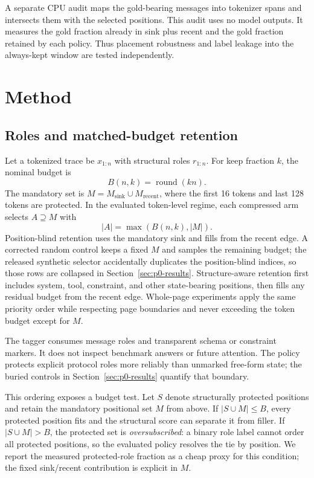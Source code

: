 A separate CPU audit maps the gold-bearing messages into tokenizer spans and
intersects them with the selected positions.  This audit uses no model outputs.
It measures the gold fraction already in sink plus recent and the gold fraction
retained by each policy.  Thus placement robustness and label leakage into the
always-kept window are tested independently.

\section{Method}
\label{sec:method}

\subsection{Roles and matched-budget retention}
\label{sec:retention-method}

Let a tokenized trace be $x_{1:n}$ with structural roles $r_{1:n}$.  For keep
fraction $k$, the nominal budget is
\begin{equation}
  B(n,k)=\operatorname{round}(kn).
  \label{eq:budget}
\end{equation}
The mandatory set is $M=M_{\mathrm{sink}}\cup M_{\mathrm{recent}}$, where the
first 16 tokens and last 128 tokens are protected.  In the evaluated token-level
regime, each compressed arm selects $A\supseteq M$ with
\begin{equation}
  |A|=\max(B(n,k),|M|).
  \label{eq:matched}
\end{equation}
Position-blind retention uses the mandatory sink and fills from the recent
edge.  A corrected random control keeps a fixed $M$ and samples the remaining
budget; the released synthetic selector accidentally duplicates the
position-blind indices, so those rows are collapsed in Section~\ref{sec:p0-results}.
Structure-aware retention first includes system, tool, constraint, and other state-bearing
positions, then fills any residual budget from the recent edge.  Whole-page
experiments apply the same priority order while respecting page boundaries and
never exceeding the token budget except for $M$.

The tagger consumes message roles and transparent schema or constraint markers.
It does not inspect benchmark answers or future attention.  The policy protects
explicit protocol roles more reliably than unmarked free-form state; the buried
controls in Section~\ref{sec:p0-results} quantify that boundary.

This ordering exposes a budget test.  Let $S$ denote structurally protected
positions and retain the mandatory positional set $M$ from above.  If
$|S\cup M|\leq B$, every protected position fits and the structural score can
separate it from filler.  If $|S\cup M|>B$, the protected set is
\emph{oversubscribed}: a binary role label cannot order all protected positions,
so the evaluated policy resolves the tie by position.  We report the measured
protected-role fraction as a cheap proxy for this condition; the fixed
sink/recent contribution is explicit in $M$.

